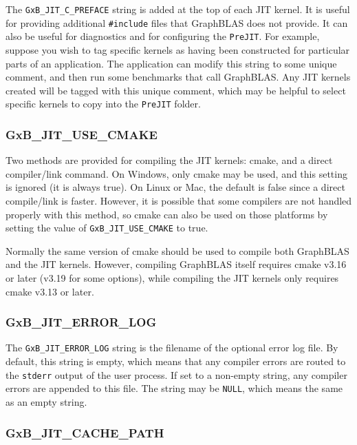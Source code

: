 \documentclass[12pt]{article}
\begin{document}
The \verb'GxB_JIT_C_PREFACE' string is added at the top of each JIT kernel.  It
is useful for providing additional \verb'#include' files that GraphBLAS does
not provide.  It can also be useful for diagnostics and for configuring the
\verb'PreJIT'.  For example, suppose you wish to tag specific kernels as having
been constructed for particular parts of an application.  The application can
modify this string to some unique comment, and then run some benchmarks that
call GraphBLAS.  Any JIT kernels created will be tagged with this unique
comment, which may be helpful to select specific kernels to copy into the
\verb'PreJIT' folder.

\subsubsection{\sf GxB\_JIT\_USE\_CMAKE}
\label{use_cmake}

Two methods are provided for compiling the JIT kernels: cmake, and a direct
compiler/link command.  On Windows, only cmake may be used, and this setting
is ignored (it is always true).  On Linux or Mac, the default is false since
a direct compile/link is faster.  However, it is possible that some compilers
are not handled properly with this method, so cmake can also be used on those
platforms by setting the value of \verb'GxB_JIT_USE_CMAKE' to true.

Normally the same version of cmake should be used to compile both GraphBLAS and
the JIT kernels.  However, compiling GraphBLAS itself requires cmake v3.16 or
later (v3.19 for some options), while compiling the JIT kernels only requires
cmake v3.13 or later.

\subsubsection{\sf GxB\_JIT\_ERROR\_LOG}

The \verb'GxB_JIT_ERROR_LOG' string is the filename of the optional error
log file.  By default, this string is empty, which means that any compiler
errors are routed to the \verb'stderr' output of the user process.  If set
to a non-empty string, any compiler errors are appended to this file.
The string may be \verb'NULL', which means the same as an empty string.

\subsubsection{\sf GxB\_JIT\_CACHE\_PATH}
\label{cache_path}
\end{document}
